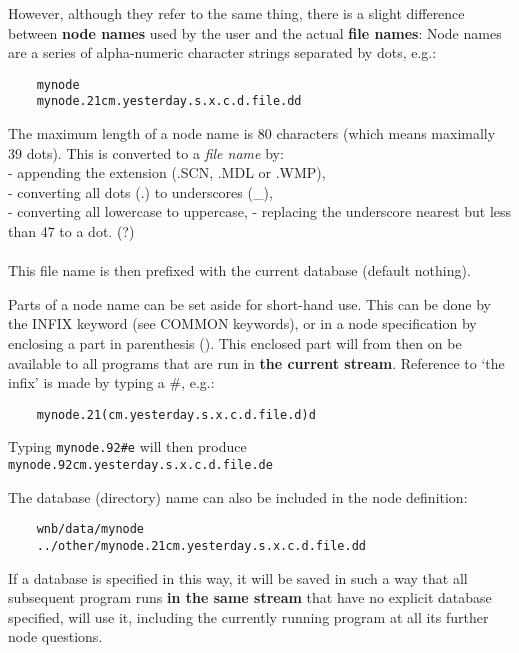 	However, although they refer to the same thing, there is a slight
difference between {\bf node names} used by the user and the actual {\bf file
names}: Node names are a series of alpha-numeric character strings separated by
dots, e.g.: 

\begin{verbatim} 
    mynode 
    mynode.21cm.yesterday.s.x.c.d.file.dd 
\end{verbatim} 

The maximum length of a node name is 80 characters (which means maximally 39
dots). This is converted to a {\em file name} by: 
\\
- appending the extension (.SCN, .MDL or .WMP), \\ 
- converting all dots (.) to underscores (\_), \\ 
- converting all lowercase to uppercase, 
- replacing the underscore nearest but less than 47 to a dot. (?) \\ 
\\
This file name is then prefixed with the current database (default nothing). 

	Parts of a node name can be set aside for short-hand use.  This can be
done by the INFIX keyword (see COMMON keywords), or in a node specification by
enclosing a part in parenthesis ().  This enclosed part will from then on be
available to all programs that are run in {\bf the current stream}.  Reference
to `the infix' is made by typing a \#, e.g.: 

\begin{verbatim} 
    mynode.21(cm.yesterday.s.x.c.d.file.d)d 
\end{verbatim} 

Typing {\tt mynode.92\#e} will then produce {\tt
mynode.92cm.yesterday.s.x.c.d.file.de} 

The database (directory) name can also be included in the node definition: 

\begin{verbatim} 
    wnb/data/mynode 
    ../other/mynode.21cm.yesterday.s.x.c.d.file.dd 
\end{verbatim} 

	If a database is specified in this way, it will be saved in such a way
that all subsequent program runs {\bf in the same stream} that have no explicit
database specified, will use it, including the currently running program at all
its further node questions. 



